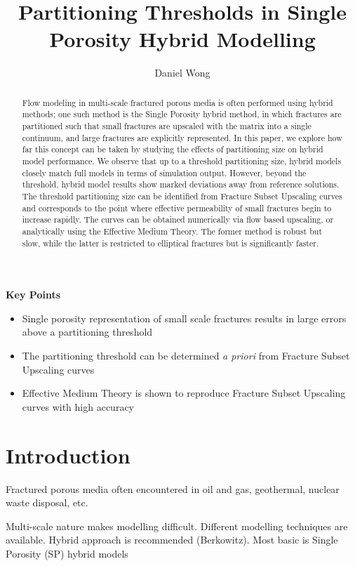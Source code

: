\documentclass[a4paper]{article}
\title{Partitioning Thresholds in Single Porosity Hybrid Modelling}
\author{Daniel Wong}
\begin{document}
\maketitle

\textbf{Key Points}
\begin{itemize}
    \item Single porosity representation of small scale fractures results in large errors above a partitioning threshold
    \item The partitioning threshold can be determined \textit{a priori} from Fracture Subset Upscaling curves
    \item Effective Medium Theory is shown to reproduce Fracture Subset Upscaling curves with high accuracy
\end{itemize}

\begin{abstract}
Flow modeling in multi-scale fractured porous media is often performed using hybrid methods; one such method is the Single Porosity hybrid method, in which fractures are partitioned such that small fractures are upscaled with the matrix into a single continuum, and large fractures are explicitly represented. In this paper, we explore how far this concept can be taken by studying the effects of partitioning size on hybrid model performance. We observe that up to a threshold partitioning size, hybrid models closely match full models in terms of simulation output. However, beyond the threshold, hybrid model results show marked deviations away from reference solutions. The threshold partitioning size can be identified from Fracture Subset Upscaling curves and corresponds to the point where effective permeability of small fractures begin to increase rapidly. The curves can be obtained numerically via flow based upscaling, or analytically using the Effective Medium Theory. The former method is robust but slow, while the latter is restricted to elliptical fractures but is significantly faster.
\end{abstract}

\section{Introduction}
Fractured porous media often encountered in oil and gas, geothermal, nuclear waste disposal, etc.

Multi-scale nature makes modelling difficult. Different modelling techniques are available. Hybrid approach is recommended (Berkowitz). Most basic is Single Porosity (SP) hybrid models 
\end{document}

